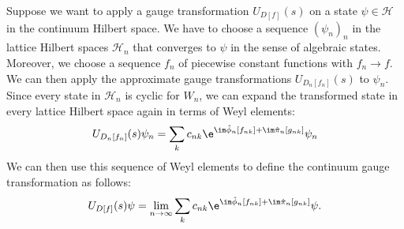 Suppose we want to apply a gauge transformation $U_{D[f]}(s)$ on a state $\psi \in \mathcal H$ in the continuum Hilbert space.
We have to choose a sequence $(\psi_n)_n$ in the lattice Hilbert spaces $\mathcal H_n$ that converges to $\psi$ in the sense of algebraic states.
Moreover, we choose a sequence $f_n$ of piecewise constant functions with $f_n\to f$.
We can then apply the approximate gauge transformations $U_{D_n[f_n]}(s)$ to $\psi_n$.
Since every state in $\mathcal H_n$ is cyclic for $W_n$, we can expand the transformed state in every lattice Hilbert space again in terms of Weyl elements:
\begin{equation}
    U_{D_n[f_n]}(s)\psi_n = \sum_k c_{nk} \e^{\im\hat\phi_n[f_{nk}] + \im\hat\pi_n[g_{nk}]} \psi_n
\end{equation}
We can then use this sequence of Weyl elements to define the continuum gauge transformation as follows:
\begin{equation}
    U_{D[f]}(s)\psi = \lim_{n\to\infty}\sum_k c_{nk} \e^{\im\hat\phi_n[f_{nk}] + \im\hat\pi_n[g_{nk}]} \psi.
\end{equation}
